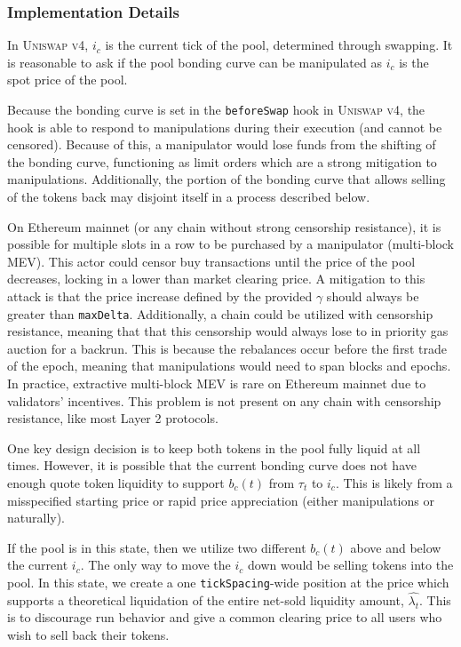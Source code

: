 \documentclass[sigconf,nonacm,prologue,table]{acmart}
\numberwithin{equation}{section}
\theoremstyle{definition}
\theoremstyle{remark}
\begin{document}
\subsubsection{Implementation Details} 

In \textsc{Uniswap v4}, $i_c$ is the current tick of the pool, determined through swapping. It is reasonable to ask if the pool bonding curve can be manipulated as $i_c$ is the spot price of the pool. 

Because the bonding curve is set in the \verb|beforeSwap| hook in \textsc{Uniswap v4}, the hook is able to respond to manipulations during their execution (and cannot be censored). Because of this, a manipulator would lose funds from the shifting of the bonding curve, functioning as limit orders which are a strong mitigation to manipulations. Additionally, the portion of the bonding curve that allows selling of the tokens back may disjoint itself in a process described below.

On Ethereum mainnet (or any chain without strong censorship resistance\cite{fox2023}), it is possible for multiple slots in a row to be purchased by a manipulator (multi-block MEV). This actor could censor buy transactions until the price of the pool decreases, locking in a  lower than market clearing price. A mitigation to this attack is that the price increase defined by the provided $\gamma$ should always be greater than \verb|maxDelta|. Additionally, a chain could be utilized with censorship resistance, meaning that that this censorship would always lose to in priority gas auction for a backrun. This is because the rebalances occur before the first trade of the epoch, meaning that manipulations would need to span blocks and epochs. In practice, extractive multi-block MEV is rare on Ethereum mainnet due to validators' incentives. This problem is not present on any chain with censorship resistance, like most Layer 2 protocols.

One key design decision is to keep both tokens in the pool fully liquid at all times. However, it is possible that the current bonding curve does not have enough quote token liquidity to support $b_c(t)$ from $\tau_t$ to $i_c$. This is likely from a misspecified starting price or rapid price appreciation (either manipulations or naturally). 

If the pool is in this state, then we utilize two different $b_c(t)$ above and below the current $i_c$. The only way to move the $i_c$ down would be selling tokens into the pool. In this state, we create a one \verb|tickSpacing|-wide position at the price which supports a theoretical liquidation of the entire net-sold liquidity amount, $\hat{\lambda_t}$. This is to discourage run behavior and give a common clearing price to all users who wish to sell back their tokens.
\end{document}
